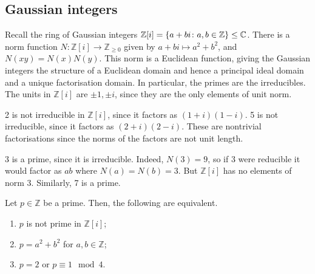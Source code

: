 \subsection{Gaussian integers}
Recall the ring of Gaussian integers \( \mathbb Z[i] = \qty{a+bi \colon a, b \in \mathbb Z} \leq \mathbb C \).
There is a norm function \( N \colon \mathbb Z[i] \to \mathbb Z_{\geq 0} \) given by \( a + bi \mapsto a^2 + b^2 \), and \( N(xy) = N(x) N(y) \).
This norm is a Euclidean function, giving the Gaussian integers the structure of a Euclidean domain and hence a principal ideal domain and a unique factorisation domain.
In particular, the primes are the irreducibles.
The units in \( \mathbb Z[i] \) are \( \pm 1, \pm i \), since they are the only elements of unit norm.
\begin{example}
    2 is not irreducible in \( \mathbb Z[i] \), since it factors as \( (1+i)(1-i) \).
    5 is not irreducible, since it factors as \( (2+i)(2-i) \).
    These are nontrivial factorisations since the norms of the factors are not unit length.

    3 is a prime, since it is irreducible.
    Indeed, \( N(3) = 9 \), so if 3 were reducible it would factor as \( ab \) where \( N(a) = N(b) = 3 \).
    But \( \mathbb Z[i] \) has no elements of norm 3.
    Similarly, 7 is a prime.
\end{example}
\begin{proposition}
    Let \( p \in \mathbb Z \) be a prime.
    Then, the following are equivalent.
    \begin{enumerate}
        \item \( p \) is not prime in \( \mathbb Z[i] \);
        \item \( p = a^2 + b^2 \) for \( a, b \in \mathbb Z \);
        \item \( p = 2 \) or \( p \equiv 1 \mod 4 \).
    \end{enumerate}
\end{proposition}
